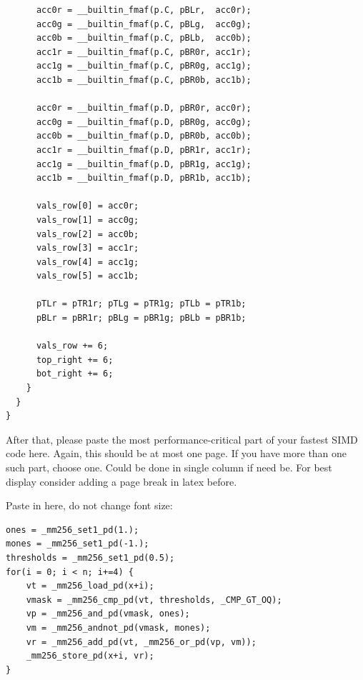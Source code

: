 \documentclass[letterpaper]{article}
\begin{document}
{\begin{Verbatim}
      acc0r = __builtin_fmaf(p.C, pBLr,  acc0r);
      acc0g = __builtin_fmaf(p.C, pBLg,  acc0g);
      acc0b = __builtin_fmaf(p.C, pBLb,  acc0b);
      acc1r = __builtin_fmaf(p.C, pBR0r, acc1r);
      acc1g = __builtin_fmaf(p.C, pBR0g, acc1g);
      acc1b = __builtin_fmaf(p.C, pBR0b, acc1b);

      acc0r = __builtin_fmaf(p.D, pBR0r, acc0r);
      acc0g = __builtin_fmaf(p.D, pBR0g, acc0g);
      acc0b = __builtin_fmaf(p.D, pBR0b, acc0b);
      acc1r = __builtin_fmaf(p.D, pBR1r, acc1r);
      acc1g = __builtin_fmaf(p.D, pBR1g, acc1g);
      acc1b = __builtin_fmaf(p.D, pBR1b, acc1b);

      vals_row[0] = acc0r;
      vals_row[1] = acc0g;
      vals_row[2] = acc0b;
      vals_row[3] = acc1r;
      vals_row[4] = acc1g;
      vals_row[5] = acc1b;

      pTLr = pTR1r; pTLg = pTR1g; pTLb = pTR1b;
      pBLr = pBR1r; pBLg = pBR1g; pBLb = pBR1b;

      vals_row += 6;
      top_right += 6;
      bot_right += 6;
    }
  }
}
\end{Verbatim}
}

After that, please paste the most performance-critical part of your fastest SIMD code here. Again, this should be at most one page. If you have more than one such part, choose one. Could be done in single column if need be. For best display consider adding a page break in latex before.

Paste in here, do not change font size:
{\fontsize{8}{10}\selectfont
\begin{Verbatim}
ones = _mm256_set1_pd(1.);
mones = _mm256_set1_pd(-1.);
thresholds = _mm256_set1_pd(0.5);
for(i = 0; i < n; i+=4) {
	vt = _mm256_load_pd(x+i);
	vmask = _mm256_cmp_pd(vt, thresholds, _CMP_GT_OQ);
	vp = _mm256_and_pd(vmask, ones);
	vm = _mm256_andnot_pd(vmask, mones);
	vr = _mm256_add_pd(vt, _mm256_or_pd(vp, vm));
	_mm256_store_pd(x+i, vr);
}
\end{Verbatim}
}\
\end{document}
